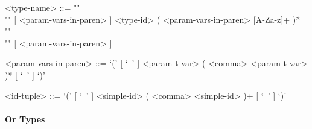 \documentclass[diploma]{softlab-thesis}
\begin{document}
\begin{itemize}
\begin{grammar}
<type-name> ::= ""\\""
[ <param-vars-in-paren> ] <type-id> ( <param-vars-in-paren> [A-Za-z]+ )* ""\\""
[ <param-vars-in-paren> ]

<param-vars-in-paren> ::=
`(' [ `\ ' ] <param-t-var> ( <comma> <param-t-var> )* [ `\ ' ] `)'

<id-tuple> ::= `(' [ `\ ' ] <simple-id> ( <comma> <simple-id> )+ [ `\ ' ] `)'
\end{grammar}

\end{itemize}

\paragraph{Or Types}
\end{document}
